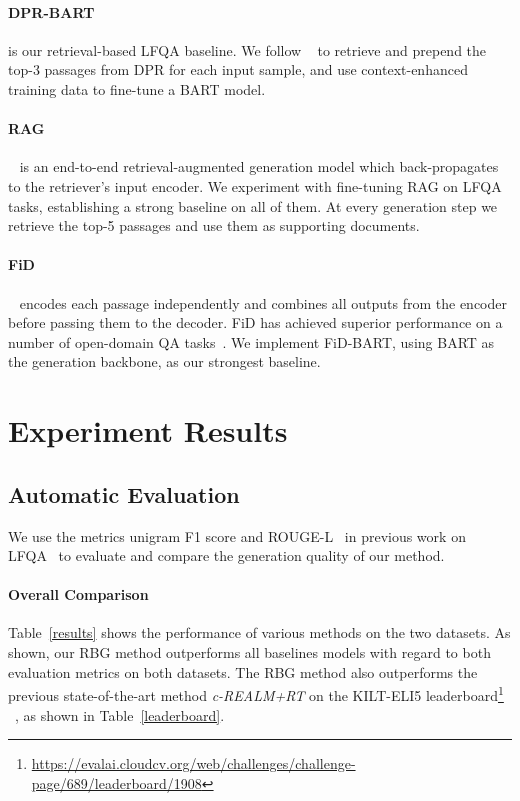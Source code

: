 \documentclass[11pt]{article}
\begin{document}
\paragraph{DPR-BART} is our retrieval-based LFQA baseline. We follow ~\citet{petronicontext} to retrieve and prepend the top-3 passages from DPR for each input sample, and use context-enhanced training data to fine-tune a BART model.
\vspace{-5pt}
\paragraph{RAG} ~\cite{NEURIPS2020_6b493230} is an end-to-end retrieval-augmented generation model which back-propagates to the retriever’s input encoder. We experiment with fine-tuning RAG on LFQA tasks, establishing a strong baseline on all of them.  At every generation step we retrieve the top-5 passages and use them as supporting documents.
\vspace{-5pt}
\paragraph{FiD} ~\cite{izacard2021leveraging} encodes each passage independently and combines all outputs from the encoder before passing them to the decoder. FiD has achieved superior performance on a number of open-domain QA tasks~\cite{izacard2021leveraging}. We implement FiD-BART, using BART as the generation backbone, as our strongest baseline.


\section{Experiment Results}
\vspace{-3pt}
\subsection{Automatic Evaluation}
\vspace{-3pt}

We use the metrics unigram F1 score and ROUGE-L~\cite{lin2004rouge} in previous work on LFQA~\cite{petroni2021kilt, krishna2021hurdles} to evaluate and compare the generation quality of our method. 

\vspace{-5pt}
\paragraph{Overall Comparison} Table~\ref{results} shows the performance of various methods on the two datasets. As shown, our RBG method outperforms all baselines models with regard to both evaluation metrics on both datasets. The RBG method also outperforms the previous state-of-the-art method \textit{c-REALM+RT} on the KILT-ELI5 leaderboard\footnote{\url{ https://evalai.cloudcv.org/web/challenges/challenge-page/689/leaderboard/1908}} ~\cite{krishna2021hurdles}, as shown in Table~\ref{leaderboard}.
\end{document}

